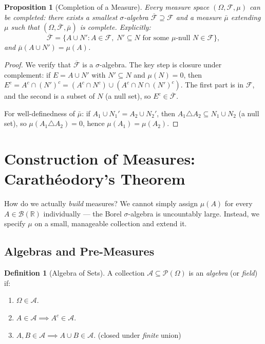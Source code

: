 \documentclass[11pt,a4paper]{article}
\theoremstyle{definition}
\newtheorem{definition}{Definition}[section]
\theoremstyle{plain}
\newtheorem{proposition}[theorem]{Proposition}
\theoremstyle{remark}
\newcommand{\R}{\mathbb{R}}
\newcommand{\powerset}{\mathcal{P}}
\newcommand{\Borel}{\mathcal{B}}
\begin{document}
\begin{proposition}[Completion of a Measure]
\label{prop:completion}
Every measure space $(\Omega, \mathcal{F}, \mu)$ can be completed: there exists
a smallest $\sigma$-algebra $\overline{\mathcal{F}} \supseteq \mathcal{F}$ and
a measure $\bar{\mu}$ extending $\mu$ such that $(\Omega, \overline{\mathcal{F}}, \bar{\mu})$
is complete. Explicitly:
\begin{equation}
    \overline{\mathcal{F}} = \{A \cup N' : A \in \mathcal{F},\; N' \subseteq N \text{ for some $\mu$-null } N \in \mathcal{F}\},
\end{equation}
and $\bar{\mu}(A \cup N') = \mu(A)$.
\end{proposition}

\begin{proof}
We verify that $\overline{\mathcal{F}}$ is a $\sigma$-algebra. The key step is
closure under complement: if $E = A \cup N'$ with $N' \subseteq N$ and $\mu(N) = 0$,
then $E^c = A^c \cap (N')^c = (A^c \cap N^c) \cup (A^c \cap N \cap (N')^c)$.
The first part is in $\mathcal{F}$, and the second is a subset of $N$ (a null set),
so $E^c \in \overline{\mathcal{F}}$.

For well-definedness of $\bar{\mu}$: if $A_1 \cup N_1' = A_2 \cup N_2'$, then
$A_1 \triangle A_2 \subseteq N_1 \cup N_2$ (a null set), so
$\mu(A_1 \triangle A_2) = 0$, hence $\mu(A_1) = \mu(A_2)$.
\end{proof}

\section{Construction of Measures: Carath\'{e}odory's Theorem}
\label{sec:construction}

How do we actually \emph{build} measures? We cannot simply assign
$\mu(A)$ for every $A \in \Borel(\R)$ individually --- the Borel $\sigma$-algebra
is uncountably large. Instead, we specify $\mu$ on a small, manageable collection
and extend it.

\subsection{Algebras and Pre-Measures}
\label{subsec:algebras}

\begin{definition}[Algebra of Sets]
\label{def:algebra}
A collection $\mathcal{A} \subseteq \powerset(\Omega)$ is an \emph{algebra}
(or \emph{field}) if:
\begin{enumerate}[nosep,label=(\roman*)]
    \item $\Omega \in \mathcal{A}$.
    \item $A \in \mathcal{A} \implies A^c \in \mathcal{A}$.
    \item $A, B \in \mathcal{A} \implies A \cup B \in \mathcal{A}$.
    \hfill(closed under \emph{finite} union)
\end{enumerate}
\end{definition}
\end{document}
